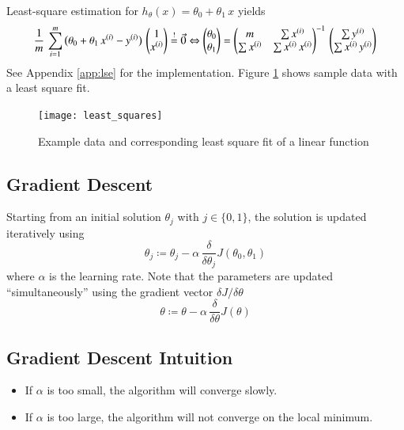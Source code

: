 \documentclass[a4paper,twoside,10pt]{article}
\begin{document}
Least-square estimation for $h_\theta(x)=\theta_0+\theta_1\,x$ yields
\begin{equation*}
\frac{1}{m}\,\displaystyle\sum_{i=1}^m\big(\theta_0+\theta_1\,x^{(i)}-y^{(i)}\big)\,\begin{pmatrix}1\\x^{(i)}\end{pmatrix}\overset{!}{=}\vec{0}\Leftrightarrow
\begin{pmatrix}\theta_0\\\theta_1\end{pmatrix}=
\begin{pmatrix}m&\sum x^{(i)}\\\sum x^{(i)}&\sum x^{(i)}\,x^{(i)}\end{pmatrix}^{-1}\,
\begin{pmatrix}\sum y^{(i)}\\\sum x^{(i)}\,y^{(i)}\end{pmatrix}
\end{equation*}
See Appendix \ref{app:lse} for the implementation. Figure \ref{fig:lse} shows sample data with a least square fit.
\begin{figure}[htbp]
  \begin{center}
    \texttt{[image: least\_squares]}
    \caption{Example data and corresponding least square fit of a linear function\label{fig:lse}}
  \end{center}
\end{figure}

\subsection{Gradient Descent}\label{cha:gradientdescent}
Starting from an initial solution $\theta_j$ with $j\in\{0,1\}$, the solution is updated iteratively using
\begin{equation*}
  \theta_j\coloneqq\theta_j-\alpha\,\frac{\delta}{\delta\theta_j}J(\theta_0,\theta_1)
\end{equation*}
where $\alpha$ is the learning rate.
Note that the parameters are updated ``simultaneously'' using the gradient vector $\delta J/\delta\theta$
\begin{equation}\label{equ:gradientdescent}
  \theta\coloneqq\theta-\alpha\,\frac{\delta}{\delta\theta}J(\theta)
\end{equation}

\subsection{Gradient Descent Intuition}
\begin{itemize}
  \item If $\alpha$ is too small, the algorithm will converge slowly.
  \item If $\alpha$ is too large, the algorithm will not converge on the local minimum.
\end{itemize}
\end{document}
